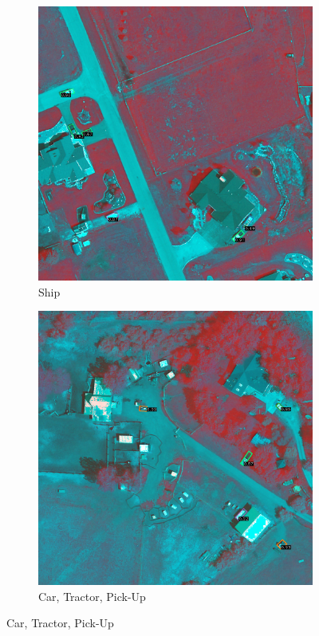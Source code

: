 \begin{figure}[h!]
    \begin{subfigure}[t]{0.38\textwidth}
        \centering
        \includegraphics[width=\linewidth]{images/015Results/02perm_exp/comp_images/gbndvi/509.png}
        \caption{Ship}
    \end{subfigure}
    \begin{subfigure}[t]{0.38\textwidth}
        \centering
        \includegraphics[width=\linewidth]{images/015Results/02perm_exp/comp_images/gbndvi/523.png}
        \caption{Car, Tractor, Pick-Up}
    \end{subfigure}
    

\end{figure}
